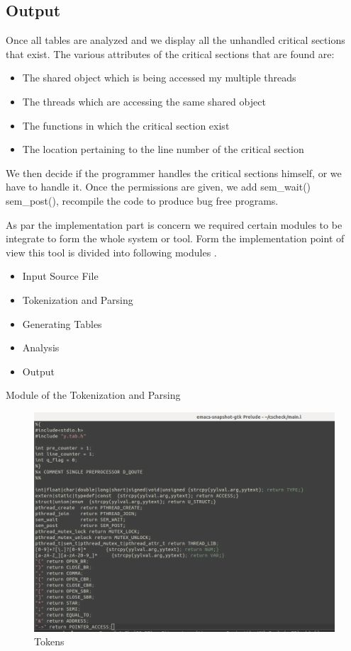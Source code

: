 \subsection{Output}
Once all tables are analyzed and we display all the unhandled critical sections that exist. The various attributes of the critical sections that are found are: 
\begin{itemize}

\item The shared object which is being accessed my multiple threads
\item The threads which are accessing the same shared object
\item The functions in which the critical section exist
\item The location pertaining to the line number of the critical section

\end{itemize}

We then decide if the programmer handles the critical sections himself, or we have to handle it. Once the permissions are given, we add sem\_wait() sem\_post(), recompile the code to produce bug free programs.

As par the implementation part is concern we required certain modules to be integrate to form the whole system or tool. Form the implementation point of view this tool is divided into following modules .
\begin{itemize}
\item Input Source File
\item Tokenization and Parsing
\item Generating Tables
\item Analysis
\item Output
\end{itemize}

Module of the Tokenization and Parsing

\begin{figure}[H]
\centering
\includegraphics[scale=0.4]{Snaps/main_l_1.png}
\caption{Tokens}
\label{<<Label>>}
\end{figure}

